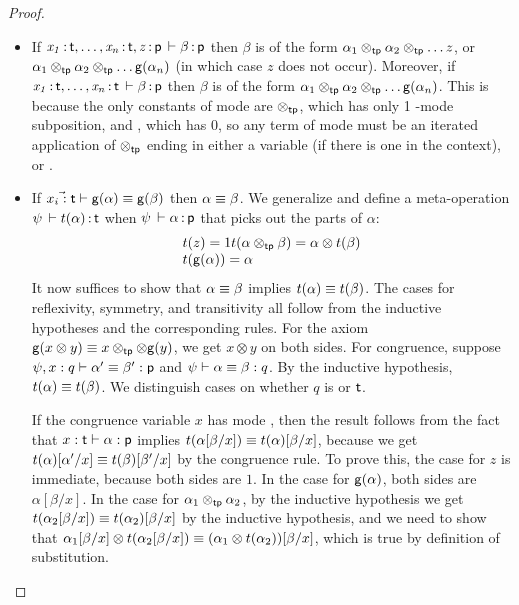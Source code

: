 \begin{proof}
\begin{itemize}
\item If $\mathit{x_1} \, \mathit{:} \, \mathit{\mathsf{t}}, \ldots, \mathit{x_n} \, \mathit{:} \, \mathit{\mathsf{t}},
  \mathit{z} \, \mathit{:} \, \mathit{\mathsf{p}} \, \vdash \beta \, \mathit{:} \, \mathsf{p}$ then $\beta$ is of the form
  $\alpha_1 \otimes_{\mathsf{tp}} \alpha_2 \otimes_{\mathsf{tp}} \ldots z$, or
  $\alpha_1 \otimes_{\mathsf{tp}} \alpha_2 \otimes_{\mathsf{tp}} \ldots \mathsf{g}(\alpha_{n})$ (in which
  case $z$ does not occur).  Moreover, if $\mathit{x_1} \, \mathit{:} \, \mathit{\mathsf{t}},
    \ldots, \mathit{x_n} \, \mathit{:} \, \mathit{\mathsf{t}} \, \vdash \beta \, \mathit{:} \, \mathsf{p}$ then $\beta$ is of the
  form $\alpha_1 \otimes_{\mathsf{tp}} \alpha_2 \otimes_{\mathsf{tp}} \ldots \mathsf{g}(\alpha_{n})$.
  This is because the only constants of mode  are $\otimes_{\mathsf{tp}}$,
  which has only 1 -mode subposition, and , which has 0,
  so any term of mode  must be an iterated application of
  $\otimes_{\mathsf{tp}}$ ending in either a variable (if there is one in the
  context), or .

\item If $\vec{x_i : \mathsf{t}} \vdash \mathsf{g}(\alpha) \equiv
  \mathsf{g}(\beta)$ then $\alpha \equiv \beta$.  We generalize and define a
  meta-operation $\psi \, \vdash t(\alpha) \, \mathit{:} \, \mathsf{t}$ when
  $\psi \, \vdash \alpha \, \mathit{:} \, \mathsf{p}$ that picks out the  parts of
  $\alpha$: 
  \[
  \begin{array}{l}
    t(z) = 1
    t(\alpha \otimes_{\mathsf{tp}} \beta) = \alpha \otimes t(\beta)\\
    t(\mathsf{g}(\alpha)) = \alpha
  \end{array}
  \]
  It now suffices to show that $\alpha \equiv \beta$ implies $t(\alpha)
  \equiv t(\beta)$.  The cases for reflexivity, symmetry, and transitivity
  all follow from the inductive hypotheses and the corresponding rules.
  For the axiom $\mathsf{g}(x \otimes y) \equiv x \otimes_{\mathsf{tp}} \otimes \mathsf{g}(y)$,
  we get $x \otimes y$ on both sides.  For congruence, suppose $\psi,x:q
  \vdash \alpha' \equiv \beta' : \mathsf{p}$ and $\psi \vdash \alpha \equiv
  \beta : q$.  By the inductive hypothesis, $t(\alpha) \equiv t(\beta)$.
  We distinguish cases on whether $q$ is  or $\mathsf{t}$.  

  If the congruence variable $x$ has mode , then the result
  follows from the fact that $x : \mathsf{t} \vdash \alpha : \mathsf{p}$
  implies $t(\alpha[\beta/x]) \equiv t(\alpha)[\beta/x]$, because we get
  $t(\alpha)[\alpha'/x] \equiv t(\beta)[\beta'/x]$ by the congruence rule.
  To prove this, the case for $z$ is immediate, because both sides are
  $1$.  In the case for $\mathsf{g}(\alpha)$, both sides are
  $\alpha[\beta/x]$.  In the case for $\alpha_1 \otimes_{\mathsf{tp}} \alpha_2$, by the
  inductive hypothesis we get $t(\alpha_2[\beta/x]) \equiv
  t(\alpha_2)[\beta/x]$ by the inductive hypothesis, and we need to show
  that $\alpha_1[\beta/x] \otimes t(\alpha_2[\beta/x]) \equiv (\alpha_1
  \otimes t(\alpha_2))[\beta/x]$, which is true by definition of
  substitution.
  

\end{itemize}
\end{proof}
